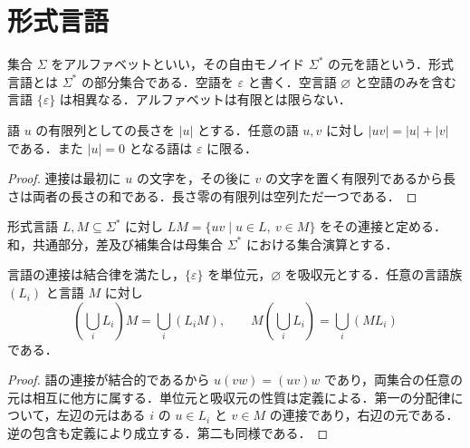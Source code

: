 \section{形式言語}
\begin{defn}[アルファベットと形式言語]
集合 $\Sigma$ をアルファベットといい，その自由モノイド $\Sigma^*$ の元を語という．形式言語とは $\Sigma^*$ の部分集合である．空語を $\varepsilon$ と書く．空言語 $\varnothing$ と空語のみを含む言語 $\{\varepsilon\}$ は相異なる．アルファベットは有限とは限らない．
\end{defn}
\begin{prop}[語の長さ]
語 $u$ の有限列としての長さを $|u|$ とする．任意の語 $u,v$ に対し $|uv|=|u|+|v|$ である．また $|u|=0$ となる語は $\varepsilon$ に限る．
\end{prop}
\begin{proof}
連接は最初に $u$ の文字を，その後に $v$ の文字を置く有限列であるから長さは両者の長さの和である．長さ零の有限列は空列ただ一つである．
\end{proof}
\begin{defn}[言語の連接]
形式言語 $L,M\subseteq\Sigma^*$ に対し $LM=\{uv\mid u\in L,\ v\in M\}$ をその連接と定める．和，共通部分，差及び補集合は母集合 $\Sigma^*$ における集合演算とする．
\end{defn}
\begin{prop}[言語連接の演算法則]
言語の連接は結合律を満たし，$\{\varepsilon\}$ を単位元，$\varnothing$ を吸収元とする．任意の言語族 $(L_i)$ と言語 $M$ に対し
\[
 (\bigcup_i L_i)M=\bigcup_i(L_iM),\qquad
 M(\bigcup_iL_i)=\bigcup_i(ML_i)
\]
である．
\end{prop}
\begin{proof}
語の連接が結合的であるから $u(vw)=(uv)w$ であり，両集合の任意の元は相互に他方に属する．単位元と吸収元の性質は定義による．第一の分配律について，左辺の元はある $i$ の $u\in L_i$ と $v\in M$ の連接であり，右辺の元である．逆の包含も定義により成立する．第二も同様である．
\end{proof}
